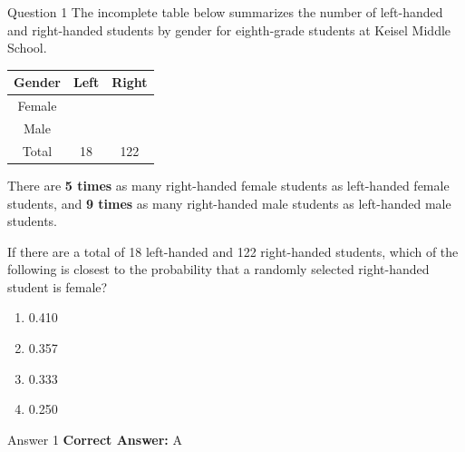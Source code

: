 \documentclass{beamer}
\begin{document}
\begin{frame}{Question 1}
\small
The incomplete table below summarizes the number of left-handed and right-handed students by gender for eighth-grade students at Keisel Middle School.

\begin{center}
\begin{tabular}{|c|c|c|}
\hline
\textbf{Gender} & \textbf{Left} & \textbf{Right} \\
\hline
Female &  &  \\
\hline
Male &  &  \\
\hline
Total & 18 & 122 \\
\hline
\end{tabular}
\end{center}

There are \textbf{5 times} as many right-handed female students as left-handed female students, and \textbf{9 times} as many right-handed male students as left-handed male students.

If there are a total of 18 left-handed and 122 right-handed students, which of the following is closest to the probability that a randomly selected right-handed student is female?
\vspace{0.35cm}
\begin{enumerate}
    \item[A.] 0.410
    \item[B.] 0.357
    \item[C.] 0.333
    \item[D.] 0.250
\end{enumerate}
\end{frame}
\begin{frame}{Answer 1}
\small
\textbf{Correct Answer:} A
\end{frame}
\end{document}
